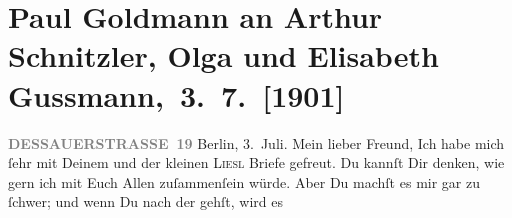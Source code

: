 

         
         \renewcommand{\erwaehntePersonen}{Personen: Alfred Kerr, Olga Schnitzler, Elisabeth Steinrück}
         \renewcommand{\erwaehnteInstitutionen}{Institutionen: Südbahn-Gesellschaft}
         \renewcommand{\erwaehnteOrte}{Orte: Berlin, Dessauer Straße, Kärnten, Schweiz, St. Anton am Arlberg, Südtirol, Tirol, Wörthersee, Österreich}
         \renewcommand{\erwaehnteWerke}{}
               \section[Paul Goldmann an Arthur Schnitzler, Olga und Elisabeth Gussmann, 3. 7. {[}1901{]}]{ Paul Goldmann an Arthur Schnitzler, Olga und Elisabeth
               Gussmann, 3. 7. {[}1901{]}}\nopagebreak{}\rehead{ }\begin{ledgroupsized}[t]{13cm}\normalsize\beginnumbering \toendnotes[C]{\smallbreak\pagebreak[2]} 
\toendnotes[C]{\smallbreak}\pstart
           \noindent{}\raggedleft{}{\pb}\textcolor{gray}{\textbf{DESSAUERSTRASSE 19}}\pend
           \pstart
           Berlin, 3. Juli.\pend
           \pstart\center{}Mein lieber Freund,\pend\pstart
           Ich habe mich ſehr mit Deinem und der kleinen \textsc{Liesl} Briefe
               gefreut.\pend
           \pstart
           Du kannſt Dir denken, wie gern ich mit Euch Allen zuſammenſein würde. Aber Du machſt
               es mir gar zu  ſchwer; und wenn Du nach der \label{K_L03071-1v}\label{K_L03071-1h} gehſt, wird es

\end{ledgroupsized}
